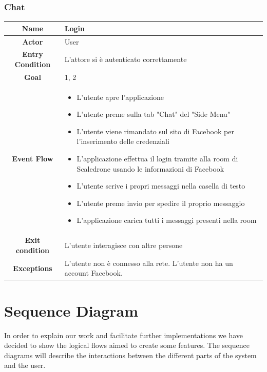 \documentclass[numbers=noenddot, 12pt, a4paper, oneside]{scrbook}
\begin{document}
\subsection*{Chat}
\begin{tabular}{|c|p{}|}
	\hline
	\parbox[c][6ex]{6ex}{\centering \textbf{Name}} & Login\\
	\hline
	\parbox[c][6ex]{6ex}{\centering \textbf{Actor}} & User \\
	\hline
	\parbox[c][10ex]{15ex}{\centering \textbf{Entry Condition}} & L'attore si è autenticato correttamente\\
	\hline
	\parbox[c][6ex]{15ex}{\centering \textbf{Goal}} &  1, 2\\
	\hline
	\parbox[c][10ex]{12ex}{\centering \textbf{Event Flow}} & \begin{itemize}
		\item L'utente apre l'applicazione
		\item L'utente preme sulla tab "Chat" del "Side Menu"
		\item L'utente viene rimandato sul sito di Facebook per l'inserimento delle credenziali
		\item L'applicazione effettua il login tramite alla room di Scaledrone usando le informazioni di Facebook
		\item  L'utente scrive i propri messaggi nella casella di testo
		\item L'utente preme invio per spedire il proprio messaggio
		\item L'applicazione carica tutti i messaggi presenti nella room
	\end{itemize}\\
	\hline
	\parbox[c][7ex]{12ex}{\centering \textbf{Exit condition}} & L'utente interagisce con altre persone \\\hline
	\parbox[c][10ex]{13ex}{\centering \textbf{Exceptions}} & L'utente non è connesso alla rete. L'utente non ha un account Facebook.\\ \hline	
\end{tabular}
\newpage


\chapter{Sequence Diagram}
In order to explain our work and facilitate further implementations we have decided to show the logical flows aimed to create some features. The sequence diagrams will describe the interactions between the different parts of the system and the user.
\end{document}
